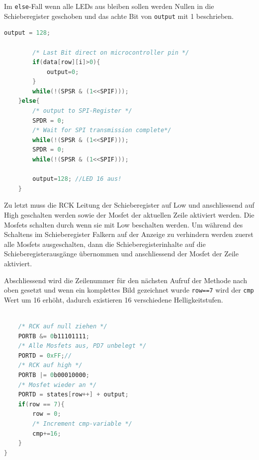 Im \texttt{else}-Fall wenn alle LEDs aus bleiben sollen werden Nullen in die
Schieberegister geschoben und das achte Bit von \texttt{output} mit 1
beschrieben.
\begin{lstlisting}[language=C,label=dcf_state_data2,caption=Zeichenmethode zur Ansteuerung der LED Matrix: Teil 3] output = 128;

		/* Last Bit direct on microcontroller pin */
		if(data[row][i]>0){
			output=0;
		}
		while(!(SPSR & (1<<SPIF)));
	}else{
		/* output to SPI-Register */
		SPDR = 0;
		/* Wait for SPI transmission complete*/
		while(!(SPSR & (1<<SPIF)));
		SPDR = 0;
		while(!(SPSR & (1<<SPIF)));

		output=128; //LED 16 aus!
	}
\end{lstlisting} 
Zu letzt muss die RCK Leitung der Schieberegister auf Low und anschliessend auf
High geschalten werden sowie der Mosfet der aktuellen Zeile aktiviert werden.
Die Mosfets schalten durch wenn sie mit Low beschalten werden. Um während des
Schaltens im Schieberegister Falkern auf der Anzeige zu verhindern werden zuerst
alle Mosfets ausgeschalten, dann die Schieberegisterinhalte auf die
Schieberegisterausgänge übernommen und anschliessend der Mosfet der Zeile
aktiviert. 

Abschliessend wird die Zeilenummer für den nächsten Aufruf der Methode nach oben
gesetzt und wenn ein komplettes Bild gezeichnet wurde \texttt{row==7} wird der
\texttt{cmp} Wert um 16 erhöht, dadurch existieren 16 verschiedene
Helligkeitstufen.

\begin{lstlisting}[language=C,label=dcf_state_data2,caption=Zeichenmethode zur Ansteuerung der LED Matrix: Teil 4]

	/* RCK auf null ziehen */
	PORTB &= 0b11101111;
	/* Alle Mosfets aus, PD7 unbelegt */
	PORTD = 0xFF;//
	/* RCK auf high */
	PORTB |= 0b00010000;
	/* Mosfet wieder an */
	PORTD = states[row++] + output;
	if(row == 7){
		row = 0;
		/* Increment cmp-variable */
		cmp+=16;
	}
}
\end{lstlisting}

